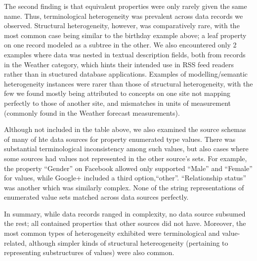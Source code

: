 \documentclass{sigchi}
\begin{document}
The second finding is that equivalent properties were only rarely given the same name.  Thus, terminological heterogeneity was prevalent across data records we observed.  Structural heterogeneity, however, was comparatively rare, with the most common case being similar to the birthday example above; a leaf property on one record modeled as a subtree in the other.  We also encountered only 2 examples where data was nested in textual description fields, both from records in the Weather category, which hints their intended use in RSS feed readers rather than in stuctured database applications.  Examples of modelling/semantic heterogeneity instances were rarer than those of structural heterogeneity, with the few we found mostly being attributed to concepts on one site not mapping perfectly to those of another site, and mismatches in units of measurement (commonly found in the Weather forecast measurements).

Although not included in the table above, we also examined the source schemas of many of hte data sources for property enumerated type values.  There was substantial terminological inconsistency among such values, but also cases where some sources had values not represented in the other source's sets.  For example, the property ``Gender''  on Facebook allowed only supported ``Male'' and ``Female'' for values, while Google+ included a third option,``other''.  ``Relationship status'' was another which was similarly complex. None of the string representations of enumerated value sets matched across data sources perfectly.

In summary, while data records ranged in complexity, no data source subsumed the rest; all contained properties that other sources did not have.  Moreover, the most common types of heterogeneity exhibited were terminological and value-related, although simpler kinds of structural hetereogeneity (pertaining to representing substructures of values) were also common.

\end{document}
